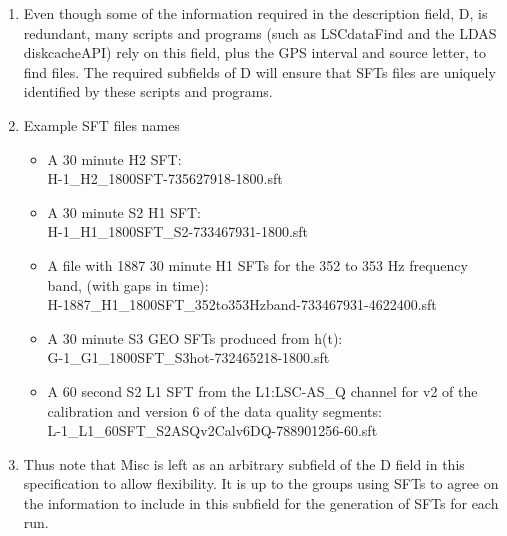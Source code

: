 \documentclass{ligodcc}
\begin{document}
\begin{enumerate}
\begin{enumerate}
\item Even though some of the information required in the description
field, D, is redundant, many scripts and programs (such as LSCdataFind
and the LDAS diskcacheAPI) rely on this field, plus the GPS interval and
source letter, to find files. The required subfields of D will ensure
that SFTs files are uniquely identified by these scripts and programs.

\item Example SFT files names
\begin{itemize}
\item A 30 minute H2 SFT:\\
   H-1\_H2\_1800SFT-735627918-1800.sft
\item A 30 minute S2 H1 SFT:\\
   H-1\_H1\_1800SFT\_S2-733467931-1800.sft
\item A file with 1887 30 minute H1 SFTs for the 352 to 353 Hz frequency band, (with gaps in time):\\
   H-1887\_H1\_1800SFT\_352to353Hzband-733467931-4622400.sft
\item A 30 minute S3 GEO SFTs produced from h(t):\\
   G-1\_G1\_1800SFT\_S3hot-732465218-1800.sft
\item A 60 second S2 L1 SFT from the L1:LSC-AS\_Q channel for v2 of the calibration and version 
  6 of the data quality segments:\\
   L-1\_L1\_60SFT\_S2ASQv2Calv6DQ-788901256-60.sft
\end{itemize}

\item Thus note that Misc is left as an arbitrary subfield of the D field
in this specification to allow flexibility.  It is up to the groups
using SFTs to agree on the information to include in this subfield for
the generation of SFTs for each run.
\end{enumerate}
\end{enumerate}
\end{document}
